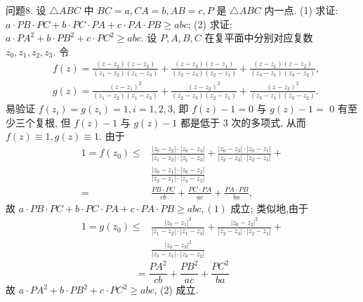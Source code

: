 问题8. 设 $\triangle A B C$ 中 $B C=a, C A=b, A B=c, P$ 是 $\triangle A B C$ 内一点.
(1) 求证: $a \cdot P B \cdot P C+b \cdot P C \cdot P A+c \cdot P A \cdot P B \geqslant a b c$;
(2) 求证: $a \cdot P A^2+b \cdot P B^2+c \cdot P C^2 \geqslant a b c$.
设 $P, A, B, C$ 在复平面中分别对应复数 $z_0, z_1, z_2, z_3$. 令
$$
\begin{aligned}
& f(z)=\frac{\left(z-z_2\right)\left(z-z_3\right)}{\left(z_1-z_2\right)\left(z_1-z_3\right)}+\frac{\left(z-z_3\right)\left(z-z_1\right)}{\left(z_2-z_3\right)\left(z_2-z_1\right)}+\frac{\left(z-z_1\right)\left(z-z_2\right)}{\left(z_3-z_1\right)\left(z_3-z_2\right)}, \\
& g(z)=\frac{\left(z-z_1\right)^2}{\left(z_1-z_2\right)\left(z_1-z_3\right)}+\frac{\left(z-z_2\right)^2}{\left(z_2-z_3\right)\left(z_2-z_1\right)}+\frac{\left(z-z_3\right)^2}{\left(z_3-z_1\right)\left(z_3-z_2\right)} .
\end{aligned}
$$
易验证 $f\left(z_i\right)=g\left(z_i\right)=1, i=1,2,3$, 即 $f(z)-1=0$ 与 $g(z)-1=$ 0 有至少三个复根, 但 $f(z)-1$ 与 $g(z)-1$ 都是低于 3 次的多项式, 从而 $f(z) \equiv 1, g(z) \equiv 1$.
由于
$$
\begin{aligned}
1=f\left(z_0\right) \leqslant & \frac{\left|z_0-z_2\right| \cdot\left|z_0-z_3\right|}{\left|z_1-z_2\right| \cdot\left|z_1-z_3\right|}+\frac{\left|z_0-z_3\right| \cdot\left|z_0-z_1\right|}{\left|z_2-z_3\right| \cdot\left|z_2-z_1\right|}+ \\
& \frac{\left|z_0-z_1\right| \cdot\left|z_0-z_2\right|}{\left|z_3-z_1\right| \cdot\left|z_3-z_2\right|} \\
= & \frac{P B \cdot P C}{c b}+\frac{P C \cdot P A}{a c}+\frac{P A \cdot P B}{b a},
\end{aligned}
$$
故 $a \cdot P B \cdot P C+b \cdot P C \cdot P A+c \cdot P A \cdot P B \geqslant a b c,(1)$ 成立;
类似地,由于
$$
\begin{aligned}
1=g\left(z_0\right) \leqslant & \frac{\left|z_0-z_1\right|^2}{\left|z_1-z_2\right| \cdot\left|z_1-z_3\right|}+\frac{\left|z_0-z_2\right|^2}{\left|z_2-z_3\right| \cdot\left|z_2-z_1\right|}+ \\
& \frac{\left|z_0-z_3\right|^2}{\left|z_3-z_1\right| \cdot\left|z_3-z_2\right|}
\end{aligned}
$$
$$
=\frac{P A^2}{c b}+\frac{P B^2}{a c}+\frac{P C^2}{b a}
$$
故 $a \cdot P A^2+b \cdot P B^2+c \cdot P C^2 \geqslant a b c$, (2) 成立.


